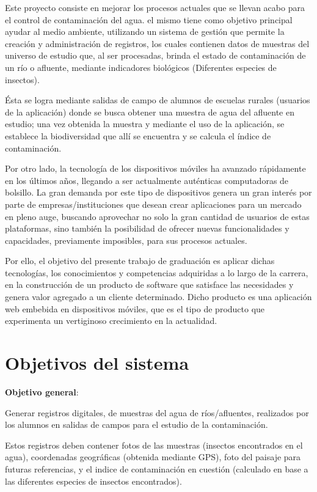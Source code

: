 Este proyecto consiste en mejorar los procesos actuales que se llevan acabo para el control de contaminación del agua. el mismo tiene como objetivo principal ayudar al medio ambiente, utilizando un sistema de gestión que permite la creación y administración de registros, los cuales contienen datos de muestras del universo de estudio que, al ser procesadas, brinda el estado de contaminación de un río o afluente, mediante indicadores biológicos (Diferentes especies de insectos). 
 
Ésta se logra mediante salidas de campo de alumnos de escuelas rurales (usuarios de la aplicación) donde se busca obtener una muestra de agua del afluente en estudio; una vez obtenida la muestra y mediante el uso de la aplicación, se establece la biodiversidad que allí se encuentra y se calcula el índice de contaminación.

Por otro lado, la tecnología de los dispositivos móviles ha avanzado rápidamente en los últimos años, llegando a ser actualmente auténticas computadoras de bolsillo. La gran demanda por este tipo de dispositivos genera un gran interés por parte de empresas/instituciones que desean crear aplicaciones para un mercado en pleno auge, buscando aprovechar no solo la gran cantidad de usuarios de estas plataformas, sino también la posibilidad de ofrecer nuevas funcionalidades y capacidades, previamente imposibles, para sus procesos actuales.

Por ello, el objetivo del presente trabajo de graduación es aplicar dichas tecnologías, los conocimientos y competencias adquiridas a lo largo de la carrera, en la construcción de un producto de software que satisface las necesidades y genera valor agregado a un cliente determinado. Dicho producto es una aplicación web embebida en dispositivos móviles, que es el tipo de producto que experimenta un vertiginoso crecimiento en la actualidad.  \newpage


\section{Objetivos del sistema}

\textbf{Objetivo general}:
\newline

Generar registros digitales, de muestras del agua de ríos/afluentes, realizados por los alumnos en salidas de campos para el estudio de la contaminación.

Estos registros deben contener fotos de las muestras (insectos encontrados en el agua), coordenadas geográficas (obtenida mediante GPS), foto del paisaje para futuras referencias, y el indice de contaminación en cuestión (calculado en base a las diferentes especies de insectos encontrados).
\newline

